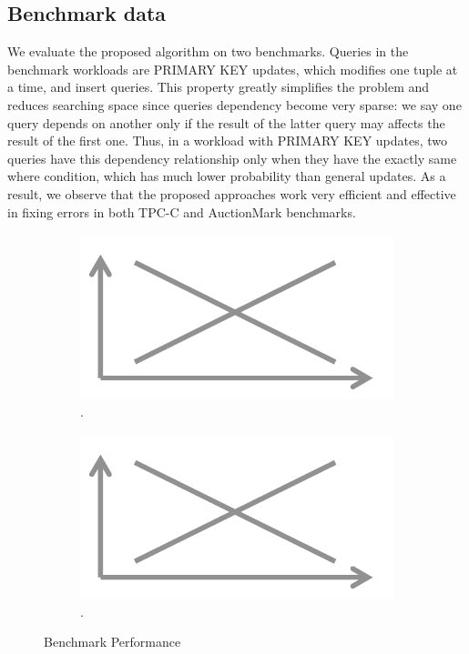 {\subsection{Benchmark data}
We evaluate the proposed algorithm on two benchmarks. Queries in the benchmark 
workloads are PRIMARY KEY updates, which modifies one tuple at a time, and insert queries. 
This property greatly simplifies the problem and reduces searching space since queries dependency 
become very sparse: we say one query depends on another only if the result of the latter
query may affects the result of the first one. Thus, in a workload with PRIMARY KEY
updates, two queries have this dependency relationship only
when they have the exactly same where condition, which has much lower probability than 
general updates. As a result, we observe that the proposed approaches work
very efficient and effective 
in fixing errors in both TPC-C and AuctionMark benchmarks. 

\begin{figure}[h]
\centering
  \begin{subfigure}[t]{.48\columnwidth}
  \includegraphics[width = .95\columnwidth]{figures/placeholder}
  \caption{.}
  \label{f:tpcc} 
  \end{subfigure}
  \begin{subfigure}[t]{.48\columnwidth}
  \includegraphics[width = .95\columnwidth]{figures/placeholder}
  \caption{.}
  \label{f:auctionmark} 
  \end{subfigure}
  \caption{Benchmark Performance}


\end{figure}}
